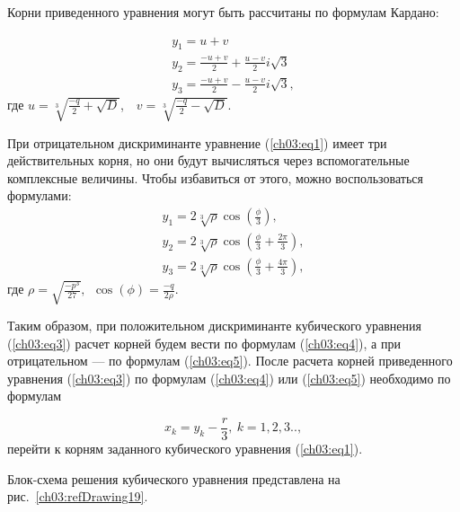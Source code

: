 Корни приведенного уравнения могут быть рассчитаны по формулам Кардано:

\begin{equation}\label{ch03:eq4}
\begin{array}{l}
y_1=u+v\\
y_2=\frac{-{u+v}}{2}+\frac{u-v}{2}i\sqrt{3}\\
y_3=\frac{-{u+v}}{2}-\frac{u-v}{2}i\sqrt{3},
\end{array}
\end{equation}
где $u=\sqrt[{3}]{\frac{-q}{2}+\sqrt{D}}$,\ \  $v=\sqrt[{3}]{\frac{-q}{2}-\sqrt{D}}$.

При отрицательном дискриминанте уравнение (\ref{ch03:eq1}) имеет три действительных корня, но они будут вычисляться
через вспомогательные комплексные величины. Чтобы избавиться от этого, можно воспользоваться формулами:
\begin{equation}\label{ch03:eq5}
\begin{array}{l}
y_1=2\sqrt[{3}]{\rho}\cos(\frac{\phi}{3}),\\
y_2=2\sqrt[{3}]{\rho}\cos(\frac{\phi}{3}+\frac{2\pi}{3}),\\
y_3=2\sqrt[{3}]{\rho}\cos(\frac{\phi}{3}+\frac{4\pi}{3}),
\end{array}
\end{equation}
где $\rho =\sqrt{\frac{-{p^{3}}}{27}},\ \ \cos(\phi )=\frac{-{q}}{2\rho}$.

Таким образом, при положительном дискриминанте кубического уравнения (\ref{ch03:eq3}) расчет корней будем вести по
формулам (\ref{ch03:eq4}), а при отрицательном --- по формулам (\ref{ch03:eq5}). После расчета корней приведенного
уравнения (\ref{ch03:eq3}) по формулам (\ref{ch03:eq4}) или (\ref{ch03:eq5}) необходимо по формулам 

\begin{equation*}
x_{k}=y_{k}-\frac{r}{3},\ k=1,2,3..,
\end{equation*}
перейти к корням заданного кубического уравнения (\ref{ch03:eq1}).

Блок-схема решения кубического уравнения представлена на рис.~\ref{ch03:refDrawing19}.

